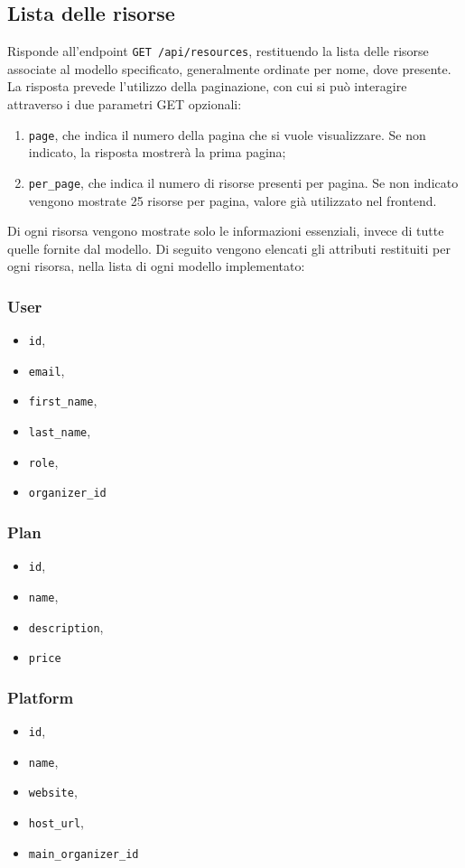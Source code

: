 \subsection{Lista delle risorse}
Risponde all'endpoint \verb|GET /api/resources|, restituendo la lista delle risorse associate al modello specificato, generalmente ordinate per nome, dove presente. La risposta prevede l'utilizzo della paginazione, con cui si può interagire attraverso i due parametri GET opzionali:
\begin{enumerate}
	\item \verb|page|, che indica il numero della pagina che si vuole visualizzare. Se non indicato, la risposta mostrerà la prima pagina;
	\item \verb|per_page|, che indica il numero di risorse presenti per pagina. Se non indicato vengono mostrate 25 risorse per pagina, valore già utilizzato nel frontend.
\end{enumerate}
Di ogni risorsa vengono mostrate solo le informazioni essenziali, invece di tutte quelle fornite dal modello. Di seguito vengono elencati gli attributi restituiti per ogni risorsa, nella lista di ogni modello implementato:

\subsubsection{User}
\begin{itemize}
	\item \verb|id|,
	\item \verb|email|,
	\item \verb|first_name|,
	\item \verb|last_name|,
	\item \verb|role|,
	\item \verb|organizer_id|
\end{itemize}

\subsubsection{Plan}
\begin{itemize}
	\item \verb|id|,
	\item \verb|name|,
	\item \verb|description|,
	\item \verb|price|
\end{itemize}

\subsubsection{Platform}
\begin{itemize}
	\item \verb|id|,
	\item \verb|name|,
	\item \verb|website|,
	\item \verb|host_url|,
	\item \verb|main_organizer_id|
\end{itemize}

